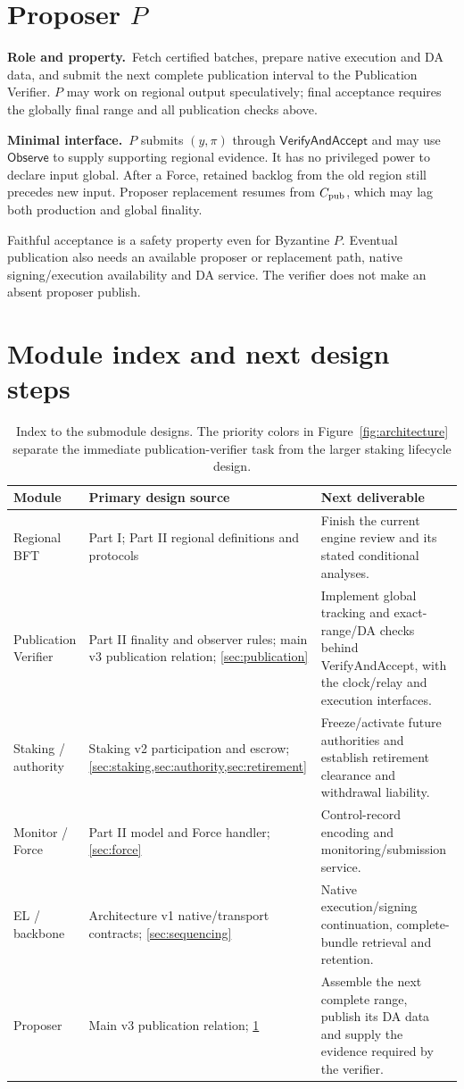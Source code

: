 \documentclass[11pt,a4paper]{article}
\newcommand{\api}[1]{\ensuremath{\mathsf{#1}}}
\newcommand{\role}{\textbf{Role and property.}\ }
\newcommand{\iface}{\textbf{Minimal interface.}\ }
\begin{document}
\section{Proposer $P$}\label{sec:proposer}
\role Fetch certified batches, prepare native execution and DA data,
and submit the next complete publication interval to the Publication
Verifier. $P$ may work on regional output speculatively; final acceptance
requires the globally final range and all publication checks above.

\iface $P$ submits $(y,\pi)$ through \api{VerifyAndAccept} and may use
\api{Observe} to supply supporting regional evidence. It has no privileged
power to declare input global. After a Force, retained backlog from the
old region still precedes new input. Proposer replacement resumes from
$C_{\rm pub}$, which may lag both production and global finality.

Faithful acceptance is a safety property even for Byzantine $P$.
Eventual publication also needs an available proposer or replacement
path, native signing/execution availability and DA service. The verifier
does not make an absent proposer publish.

\section{Module index and next design steps}\label{sec:index}
\begin{table}[H]\centering\small
\begin{tabularx}{\linewidth}{@{}p{.23\linewidth}Y Y@{}}
\toprule Module & Primary design source & Next deliverable\\\midrule
Regional BFT & Part I; Part II regional definitions and protocols
& Finish the current engine review and its stated conditional analyses.\\
Publication Verifier & Part II finality and observer rules; main v3
publication relation; \cref{sec:publication}
& Implement global tracking and exact-range/DA checks behind
VerifyAndAccept, with the clock/relay and execution interfaces.\\
Staking / authority & Staking v2 participation and escrow;
\cref{sec:staking,sec:authority,sec:retirement}
& Freeze/activate future authorities and establish retirement clearance
and withdrawal liability.\\
Monitor / Force & Part II model and Force handler; \cref{sec:force}
& Control-record encoding and monitoring/submission service.\\
EL / backbone & Architecture v1 native/transport contracts;
\cref{sec:sequencing}
& Native execution/signing continuation, complete-bundle retrieval
and retention.\\
Proposer & Main v3 publication relation; \cref{sec:proposer}
& Assemble the next complete range, publish its DA data and supply
the evidence required by the verifier.\\\bottomrule
\end{tabularx}
\caption{Index to the submodule designs. The priority colors in
Figure~\ref{fig:architecture} separate the immediate publication-verifier task from
the larger staking lifecycle design.}
\end{table}
\end{document}
